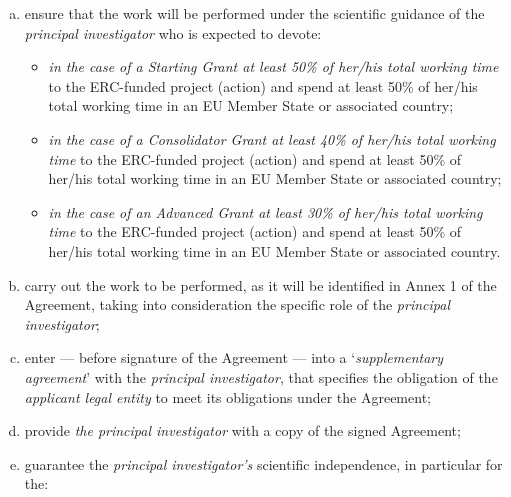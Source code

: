 \documentclass[a4paper,10pt,ngerman,numbers=noenddot]{scrreprt}
\begin{document}
\begin{enumerate}[a)]
\item ensure that the work will be performed under the scientific guidance of the \textit{principal investigator} who is expected to devote:

\begin{itemize}
\renewcommand{\labelitemi}{$-$}
\item \textit{in the case of a Starting Grant at least 50\% of her/his
total working time} to the ERC-funded project (action) and spend at
least 50\% of her/his total working time in an EU Member State or
associated country;
\item \textit{in the case of a Consolidator Grant at least 40\% of
her/his total working time} to the ERC-funded project (action) and spend
at least 50\% of her/his total working time in an EU Member State or
associated country;
\item \textit{in the case of an Advanced Grant at least 30\% of
her/his total working time} to the ERC-funded project (action) and spend
at least 50\% of her/his total working time in an EU Member State or
associated country.
\end{itemize}

\item carry out the work to be performed, as it will be identified in Annex 1 of the Agreement, taking into consideration the specific role of the \textit{principal investigator};
\item enter --- before signature of the Agreement --- into a `\textit{supplementary agreement}' with the \textit{principal investigator}, that specifies the obligation of the \textit{applicant legal entity} to meet its obligations under the Agreement;
\item provide \textit{the principal investigator} with a copy of the signed Agreement;
\item guarantee the \textit{principal investigator's} scientific independence, in particular for the:


\end{enumerate}
\end{document}
